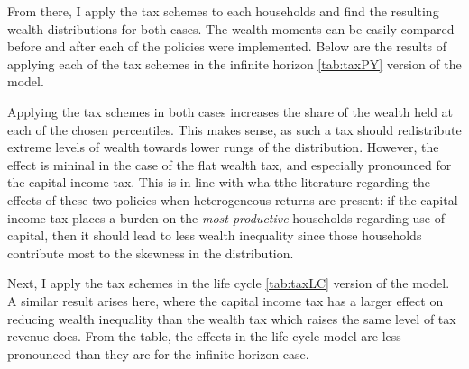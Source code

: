\par From there, I apply the tax schemes to each households and find the resulting wealth distributions for both cases. The wealth moments can be easily compared before and after each of the policies were implemented. Below are the results of applying each of the tax schemes in the infinite horizon \ref{tab:taxPY} version of the model. 
\unskip

\par Applying the tax schemes in both cases increases the share of the wealth held at each of the chosen percentiles. This makes sense, as such a tax should redistribute extreme levels of wealth towards lower rungs of the distribution. However, the effect is mininal in the case of the flat wealth tax, and especially pronounced for the capital income tax. This is in line with wha tthe literature regarding the effects of these two policies when heterogeneous returns are present: if the capital income tax places a burden on the \textit{most productive} households regarding use of capital, then it should lead to less wealth inequality since those households contribute most to the skewness in the distribution.

\par Next, I apply the tax schemes in the life cycle \ref{tab:taxLC} version of the model. A similar result arises here, where the capital income tax has a larger effect on reducing wealth inequality than the wealth tax which raises the same level of tax revenue does. From the table, the effects in the life-cycle model are less pronounced than they are for the infinite horizon case. 


\unskip






